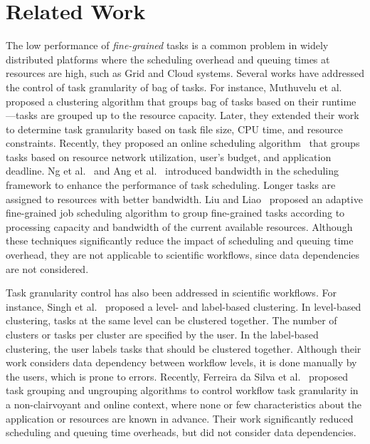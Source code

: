 \documentclass[final]{IEEEtran}
\begin{document}
\section{Related Work}

The low performance of \emph{fine-grained} tasks is a common problem in widely distributed platforms where the scheduling overhead and queuing times at resources are high, such as Grid and Cloud systems. Several works have addressed the control of task granularity of bag of tasks. For instance, Muthuvelu et al.~\cite{Muthuvelu:2005:DJG:1082290.1082297} proposed a clustering algorithm that groups bag of tasks based on their runtime---tasks are grouped up to the resource capacity. Later, they extended their work~\cite{4493929} to determine task granularity based on task file size, CPU time, and resource constraints. Recently, they proposed an online scheduling algorithm~\cite{Muthuvelu2010,Muthuvelu2013170} that groups tasks based on resource network utilization, user's budget, and application deadline. Ng et al.~\cite{keat-2006} and Ang et al.~\cite{ang-2009} introduced bandwidth in the scheduling framework to enhance the performance of task scheduling. Longer tasks are assigned to resources with better bandwidth. Liu and Liao~\cite{4958835} proposed an adaptive fine-grained job scheduling algorithm to group fine-grained tasks according to processing capacity and bandwidth of the current available resources. Although these techniques significantly reduce the impact of scheduling and queuing time overhead, they are not applicable to scientific workflows, since data dependencies are not considered.

Task granularity control has also been addressed in scientific workflows. For instance, Singh et al.~\cite{Singh:2008:WTC:1341811.1341822} proposed a level- and label-based clustering. In level-based clustering, tasks at the same level can be clustered together. The number of clusters or tasks per cluster are specified by the user. In the label-based clustering, the user labels tasks that should be clustered together. Although their work considers data dependency between workflow levels, it is done manually by the users, which is prone to errors. Recently, Ferreira da Silva et al.~\cite{europar-granularity} proposed task grouping and ungrouping algorithms to control workflow task granularity in a non-clairvoyant and online context, where none or few characteristics about the application or resources are known in advance. Their work significantly reduced scheduling and queuing time overheads, but did not consider data dependencies.
\end{document}
